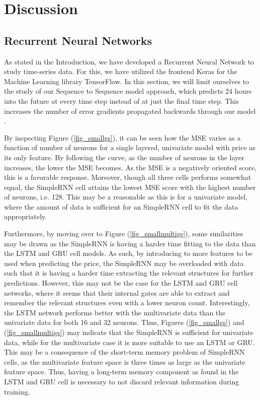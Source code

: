 \documentclass
[twocolumn,
secnumarabic,
nobibnotes,
aps,
prl,
reprint,
groupedaddress,
amsmath,
amssymb,
]{revtex4-2}
\begin{document}
\section{Discussion}

\subsection{Recurrent Neural Networks}
As stated in the Introduction, we have developed a Recurrent Neural Network to study time-series data. For this, we have utilized the frontend Keras for the Machine Learning library TensorFlow. In this section, we will limit ourselves to the study of our Sequence to Sequence model approach, which predicts 24 hours into the future at every time step instead of at just the final time step. This increases the number of error gradients propagated backwards through our model \cite{Geron2019}. 

By inspecting Figure (\ref{fig_smallgs}), it can be seen how the MSE varies as a function of number of neurons for a single layered, univariate model with price as its only feature. By following the curve, as the number of neurons in the layer increases, the lower the MSE becomes. As the MSE is a negatively oriented score, this is a favorable response. Moreover, though all three cells performs somewhat equal, the SimpleRNN cell attains the lowest MSE score with the highest number of neurons, i.e. 128. This may be a reasonable as this is for a univariate model, where the amount of data is sufficient for an SimpleRNN cell to fit the data appropriately. 

Furthermore, by moving over to Figure (\ref{fig_smallmultigs}), some similarities may be drawn as the SimpleRNN is having a harder time fitting to the data than the LSTM and GRU cell models. As such, by introducing to more features to be used when predicting the price, the SimpleRNN may be overloaded with data such that it is having a harder time extracting the relevant structures for further predictions. However, this may not be the case for the LSTM and GRU cell networks, where it seems that their internal gates are able to extract and remember the relevant structures even with a lower neuron count. Interestingly, the LSTM network performs better with the multivariate data than the univariate data for both 16 and 32 neurons. Thus, Figures (\ref{fig_smallgs}) and (\ref{fig_smallmultigs}) may indicate that the SimpleRNN is sufficient for univariate data, while for the multivariate case it is more suitable to use an LSTM or GRU. This may be a consequence of the short-term memory problem of SimpleRNN cells, as the multivariate feature space is three times as large as the univariate feature space. Thus, having a long-term memory component as found in the LSTM and GRU cell is necessary to not discard relevant information during training.
\end{document}
